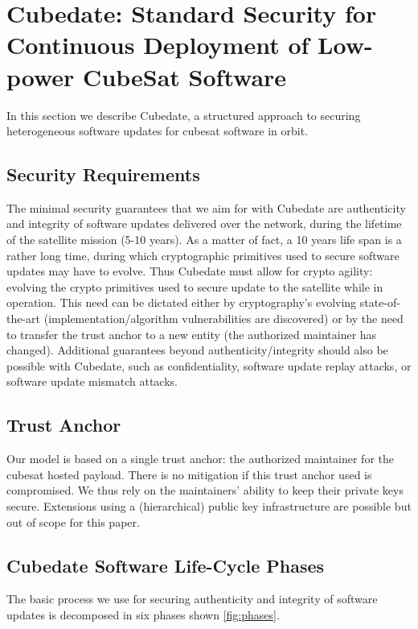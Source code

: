 \section{Cubedate: Standard Security for Continuous Deployment of Low-power CubeSat Software}
\label{sec:low-power-orbital-communication-arch}

In this section we describe Cubedate, a structured approach to securing heterogeneous software updates for cubesat software in orbit.

\subsection{Security Requirements}
The minimal security guarantees that we aim for with Cubedate are authenticity and integrity of software updates delivered over the network, during the lifetime of the satellite mission (5-10 years).
As a matter of fact, a 10 years life span is a rather long time, during which cryptographic primitives used to secure software updates may have to evolve.
Thus Cubedate must allow for crypto agility: evolving the crypto primitives used to secure update to the satellite while in operation. This need can be dictated either by cryptography's evolving state-of-the-art (implementation/algorithm vulnerabilities are discovered) or by the need to transfer the trust anchor to a new entity (the authorized maintainer has changed).
Additional guarantees beyond authenticity/integrity should also be possible with Cubedate, such as confidentiality, software update replay attacks, or software update mismatch attacks.

\subsection{Trust Anchor}
Our model is based on a single trust anchor: the authorized maintainer for the cubesat hosted payload.
There is no mitigation if this trust anchor used is compromised. 
We thus rely on the maintainers' ability to keep their private keys secure. 
Extensions using a (hierarchical) public key infrastructure are possible but out of scope for this paper.

\subsection{Cubedate Software Life-Cycle Phases}
The basic process we use for securing authenticity and integrity of software updates is decomposed in six phases shown \autoref{fig:phases}. 

